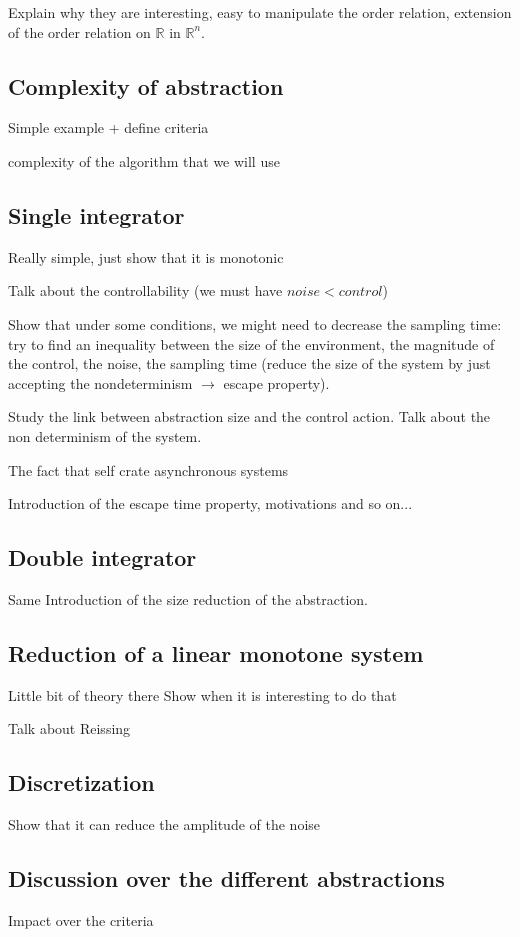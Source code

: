 \documentclass[notitlepage]{article}
\theoremstyle{named}
\begin{document}
Explain why they are interesting, easy to manipulate the order relation, extension of the order relation on $\mathbb{R}$ in $\mathbb{R}^n$.

\subsection{Complexity of abstraction}
Simple example + define criteria

complexity of the algorithm that we will use


\subsection{Single integrator}
Really simple, just show that it is monotonic

Talk about the controllability (we must have $noise<control$)

Show that under some conditions, we might need to decrease the sampling time: try to find an inequality between the size of the environment, the magnitude of the control, the noise, the sampling time (reduce the size of the system by just accepting the nondeterminism $\rightarrow$ escape property).

Study the link between abstraction size and the control action.
Talk about the non determinism of the system.

The fact that self crate asynchronous systems

Introduction of the escape time property, motivations and so on...

\subsection{Double integrator}
Same
Introduction of the size reduction of the abstraction.

\subsection{Reduction of a linear monotone system}
Little bit of theory there
Show when it is interesting to do that

Talk about Reissing 

\subsection{Discretization}
Show that it can reduce the amplitude of the noise

\subsection{Discussion over the different abstractions}
Impact over the criteria
\end{document}
